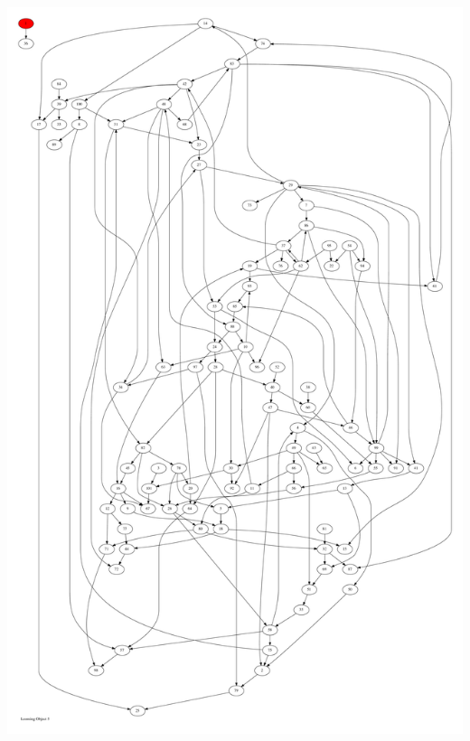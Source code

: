 \documentclass{article}
\begin{document}
\newpage
\includegraphics[max height=\textheight,max width=\textwidth]{looming_object/loom_obj5_pp.pdf}
\end{document}
